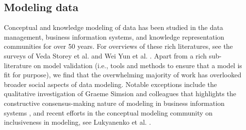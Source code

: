 \subsection{Modeling data}

Conceptual and knowledge modeling of data has been studied in the data management, business information systems, and knowledge representation communities for over 50 years.  For overviews of these rich literatures, see the surveys of Veda Storey et al. \cite{akoka,storey} and Wei Yun et al. \cite{yun2021}.  Apart from a rich sub-literature on model validation (i.e., tools and methods to ensure that a model is fit for purpose), we find that the overwhelming majority of work has overlooked broader social aspects of data modeling.   Notable exceptions include the qualitative investigation of Graeme Simsion and colleagues that highlights the constructive consensus-making nature of modeling in business information systems \cite{simsion}, and recent efforts in the conceptual modeling community on inclusiveness in modeling, see  Lukyanenko et al. \cite{LukyanenkoBSP023}. 